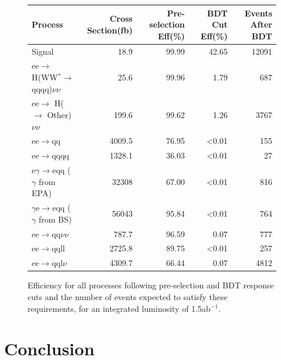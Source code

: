 \begin{figure}
  \centering
  \begin{tabular}{l r r r r}
   \toprule
    Process & Cross Section(fb) & Pre-selection Eff(\%) & BDT Cut Eff(\%) & Events After BDT     \\
    \midrule
    Signal             & 18.9    &  99.99  & 42.65 & 12091    \\ 
    \midrule
    ee$\rightarrow$ H(WW$^*\rightarrow$qqqq)$\nu\nu$  & 25.6    &  99.96 & 1.79 & 687  \\
    \midrule
    ee$\rightarrow$ H($\rightarrow$ Other)$\nu\nu$ & 199.6 & 99.62 & 1.26 & 3767 \\
    \midrule
    ee$\rightarrow$qq               & 4009.5    & 76.95 &  <0.01 & 155  \\ 
    \midrule
    ee$\rightarrow$qqqq               & 1328.1    &  36.03 & <0.01 & 27   \\ 
    \midrule
    e$\gamma$$\rightarrow$eqq ($\gamma$ from EPA)                 & 32308    & 67.00  & <0.01 & 816    \\ 
    \midrule
    $\gamma$e$\rightarrow$eqq ($\gamma$ from BS)               &  56043   & 95.84 & <0.01 & 764  \\ 
    \midrule
    ee$\rightarrow$qq$\nu\nu$               & 787.7    & 96.59 & 0.07 & 777   \\ 
    \midrule
    ee$\rightarrow$qqll               & 2725.8    & 89.75  & <0.01 & 257    \\ 
    \midrule
    ee$\rightarrow$qql$\nu$              & 4309.7    & 66.44  & 0.07 & 4812    \\ 
    \bottomrule
  \end{tabular}
  \caption[Samples Used]{Efficiency for all processes following pre-selection and BDT response cuts and the number of events expected to satisfy these requirements, for an integrated luminosity of 1.5ab$^{-1}$.}
  \label{cuts}
\end{figure}

\section{Conclusion}

